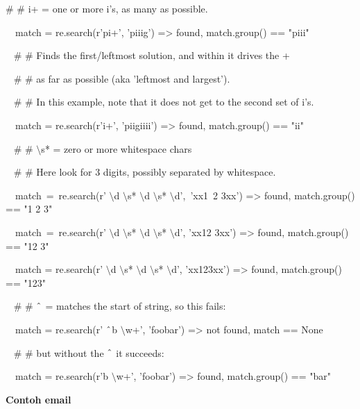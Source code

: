 \begin{12pt}
\begin{12pt}
\begin{12pt}
\begin{12pt}
\begin{12pt}
\begin{12pt}
\begin{12pt}
\noindent 
 $  \#  $ $  \#  $ i+ = one or more i's, as many as possible. \par
\noindent 
~~match = re.search(r'pi+', 'piiig') =>  found, match.group() == "piii" \par
\vspace{12pt}
\noindent 
~  $  \#  $ $  \#  $ Finds the first/leftmost solution, and within it drives the + \par
\noindent 
~  $  \#  $ $  \#  $ as far as possible (aka 'leftmost and largest'). \par
\noindent 
~  $  \#  $ $  \#  $ In this example, note that it does not get to the second set of i's. \par
\noindent 
~~match = re.search(r'i+', 'piigiiii') =>  found, match.group() == "ii" \par
\vspace{12pt}
\noindent 
~  $  \#  $ $  \#  $  $  \setminus  $s* = zero or more whitespace chars \par
\noindent 
~  $  \#  $ $  \#  $ Here look for 3 digits, possibly separated by whitespace. \par
\noindent 
~~match~=~re.search(r' $  \setminus  $d $  \setminus  $s* $  \setminus  $d $  \setminus  $s* $  \setminus  $d',~'xx1~2   3xx') =>  found, match.group() == "1 2   3" \par
\noindent 
~~match~=~re.search(r' $  \setminus  $d $  \setminus  $s* $  \setminus  $d $  \setminus  $s* $  \setminus  $d', 'xx12  3xx') =>  found, match.group() == "12  3" \par
\noindent 
~~match = re.search(r' $  \setminus  $d $  \setminus  $s* $  \setminus  $d $  \setminus  $s* $  \setminus  $d', 'xx123xx') =>  found, match.group() == "123" \par
\vspace{12pt}
\noindent 
~  $  \#  $ $  \#  $  $  \string^  $ = matches the start of string, so this fails: \par
\noindent 
~~match = re.search(r' $  \string^  $b $  \setminus  $w+', 'foobar') =>  not found, match == None \par
\noindent 
~  $  \#  $ $  \#  $ but without the  $  \string^  $ it succeeds: \par
\noindent 
~~match = re.search(r'b $  \setminus  $w+', 'foobar') =>  found, match.group() == "bar" \par
\vspace{12pt}
\vspace{12pt}
\noindent 
{\fontsize{14pt}{14pt}\selectfont \textbf{Contoh email} \\} \par

\end{12pt}
\end{12pt}
\end{12pt}
\end{12pt}
\end{12pt}
\end{12pt}
\end{12pt}
